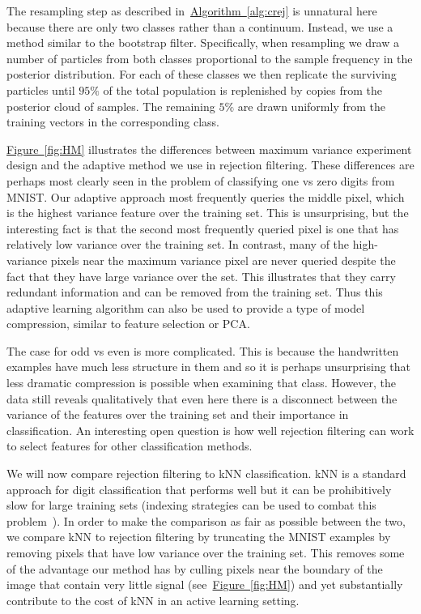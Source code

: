 \documentclass{article} %
\newcommand{\fig}[1]{\hyperref[fig:#1]{Figure~\ref*{fig:#1}}}
\newcommand{\alg}[1]{\hyperref[alg:#1]{Algorithm~\ref*{alg:#1}}}
\begin{document}
 The resampling step as described in~\alg{crej} is unnatural here because there are only two classes rather than a continuum.  Instead, we use a method similar to the bootstrap filter.  Specifically, when resampling we draw a number of particles from both
classes proportional to the sample frequency in the posterior distribution.  For each of these classes we then replicate the surviving particles until $95\%$ of the total population is replenished
by copies from the posterior cloud of samples.  The remaining $5\%$ are drawn uniformly from the training vectors in the corresponding class.

\fig{HM} illustrates the differences between maximum variance experiment design and the adaptive method we use in rejection filtering.  These differences
are perhaps most clearly seen in the problem of classifying one vs zero digits from MNIST.  Our adaptive approach most frequently queries the middle pixel, which is the 
highest variance feature over the training set.  This is unsurprising, but the interesting fact is that the second most frequently queried pixel is one that has relatively low variance
over the training set.  In contrast, many of the high-variance pixels near the maximum variance pixel are never queried despite the fact that they have large variance over the set.
This illustrates that they carry redundant information and can be removed from the training set.  Thus this adaptive learning algorithm can also be used to provide a type of model compression, similar to feature selection
or PCA.

The case for odd vs even is more complicated.  This is because the handwritten examples have much less structure in them and so it is perhaps unsurprising that less dramatic compression is possible when examining that class. However, the data still reveals qualitatively that even here there is a disconnect between the variance of the features over the training set and their importance in classification.
An interesting open question is how well rejection filtering
can work to select features for other classification methods.

We will now compare rejection filtering to kNN classification.  kNN is a standard approach for digit classification that performs well but it can be prohibitively slow for
large training sets \cite{yu2010high} (indexing strategies can be used to combat this problem~\cite{yu2001indexing}).  In order to make the comparison as fair as possible between the two, we compare kNN to rejection filtering by truncating the 
MNIST examples by removing pixels that have low variance over the training set.  This removes some of the advantage our method has by culling pixels near
the boundary of the image that contain very little signal  (see~\fig{HM}) and yet substantially contribute to the cost of kNN in an active learning setting.
\end{document}

